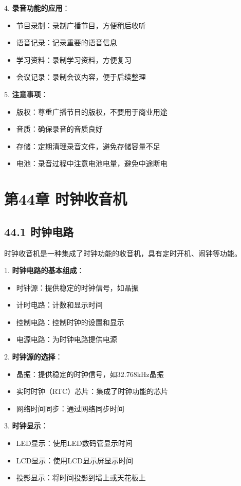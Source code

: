\documentclass[12pt,UTF8]{ctexbook}
\begin{document}
4. \textbf{录音功能的应用}：
   \begin{itemize}[leftmargin=3.5em]
   \item 节目录制：录制广播节目，方便稍后收听
   \item 语音记录：记录重要的语音信息
   \item 学习资料：录制学习资料，方便复习
   \item 会议记录：录制会议内容，便于后续整理
   \end{itemize}

5. \textbf{注意事项}：
   \begin{itemize}[leftmargin=3.5em]
   \item 版权：尊重广播节目的版权，不要用于商业用途
   \item 音质：确保录音的音质良好
   \item 存储：定期清理录音文件，避免存储容量不足
   \item 电池：录音过程中注意电池电量，避免中途断电
   \end{itemize}

\chapter*{第44章 时钟收音机}
\section*{44.1 时钟电路}

时钟收音机是一种集成了时钟功能的收音机，具有定时开机、闹钟等功能。

1. \textbf{时钟电路的基本组成}：
   \begin{itemize}[leftmargin=3.5em]
   \item 时钟源：提供稳定的时钟信号，如晶振
   \item 计时电路：计数和显示时间
   \item 控制电路：控制时钟的设置和显示
   \item 电源电路：为时钟电路提供电源
   \end{itemize}

2. \textbf{时钟源的选择}：
   \begin{itemize}[leftmargin=3.5em]
   \item 晶振：提供稳定的时钟信号，如32.768kHz晶振
   \item 实时时钟（RTC）芯片：集成了时钟功能的芯片
   \item 网络时间同步：通过网络同步时间
   \end{itemize}

3. \textbf{时钟显示}：
   \begin{itemize}[leftmargin=3.5em]
   \item LED显示：使用LED数码管显示时间
   \item LCD显示：使用LCD显示屏显示时间
   \item 投影显示：将时间投影到墙上或天花板上
   \end{itemize}
\end{document}
